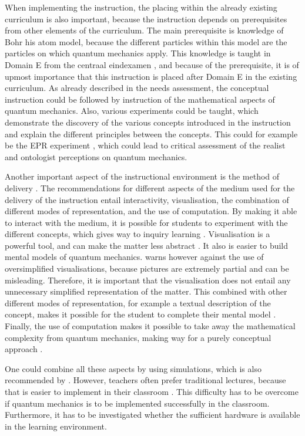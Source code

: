 \documentclass[11pt,twoside]{report} %
\begin{document}
When implementing the instruction, the placing within the already existing curriculum is also important, because the instruction depends on prerequisites from other elements of the curriculum. The main prerequisite is knowledge of Bohr his atom model, because the different particles within this model are the particles on which quantum mechanics apply. This knowledge is taught in Domain E from the centraal eindexamen \cite{eindexamen2016}, and because of the prerequisite, it is of upmost importance that this instruction is placed after Domain E in the existing curriculum. As already described in the needs assessment, the conceptual instruction could be followed by instruction of the mathematical aspects of quantum mechanics. Also, various experiments could be taught, which demonstrate the discovery of the various concepts introduced in the instruction and explain the different principles between the concepts. This could for example be the EPR experiment \cite{kuttner, muller, velentzas}, which could lead to critical assessment of the realist and ontologist perceptions on quantum mechanics.

Another important aspect of the instructional environment is the method of delivery \cite{smithragan}. The recommendations for different aspects of the medium used for the delivery of the instruction entail interactivity, visualisation, the combination of different modes of representation, and the use of computation. By making it able to interact with the medium, it is possible for students to experiment with the different concepts, which gives way to inquiry learning \cite{adegoke, asikainen, dori, mckagan}. Visualisation is a powerful tool, and can make the matter less abstract \cite{dori, henriksen, mckagan}. It also is easier to build mental models of quantum mechanics.  warns however against the use of oversimplified visualisations, because pictures are extremely partial and can be misleading. Therefore, it is important that the visualisation does not entail any unnecessary simplified representation of the matter. This combined with other different modes of representation, for example a textual description of the concept, makes it possible for the student to complete their mental model \cite{dori}. Finally, the use of computation makes it possible to take away the mathematical complexity from quantum mechanics, making way for a purely conceptual approach \cite{barnes, mckagan, velentzas}.

One could combine all these aspects by using simulations, which is also recommended by . However, teachers often prefer traditional lectures, because that is easier to implement in their classroom \cite{adegoke}. This difficulty has to be overcome if quantum mechanics is to be implemented successfully in the classroom. Furthermore, it has to be investigated whether the sufficient hardware is available in the learning environment.
\end{document}

